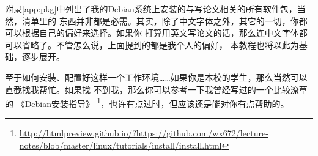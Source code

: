 附录\ref{app:pkg}中列出了我的Debian系统上安装的与写论文相关的所有软件包，当然，清单里的
东西并非都是必需。其实，除了中文字体之外，其它的一切，你都可以根据自己的偏好来选择。如果你
打算用英文写论文的话，那么连中文字体都可以省略了。不管怎么说，上面提到的都是我个人的偏好，
本教程也将以此为基础，逐步展开。

至于如何安装、配置好这样一个工作环境……如果你是本校的学生，那么当然可以直截找我帮忙。如果找
不到我，那么你可以参考一下我曾经写过的一个比较潦草的%
\href{http://htmlpreview.github.io/?https://github.com/wx672/lecture-notes/blob/master/linux/tutorials/install/install.html}{《Debian安装指导》}%
\footnote{\url{http://htmlpreview.github.io/?https://github.com/wx672/lecture-notes/blob/master/linux/tutorials/install/install.html}}，也许有点过时，但应该还是能对你有点帮助的。

